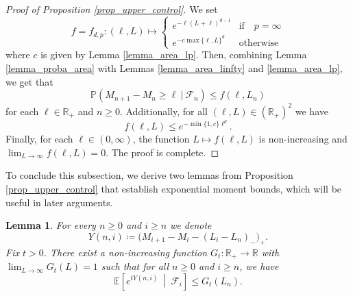 \documentclass[a4paper, 11pt]{article}
\theoremstyle{plain}
\newtheorem{Lemma}[Theorem]{Lemma}
\theoremstyle{definition}
\newcommand{\E}{\mathbb{E}}
\newcommand{\R}{\mathbb{R}}
\renewcommand{\P}{\mathbb{P}}
\numberwithin{equation}{section}
\begin{document}
\begin{proof}[Proof of Proposition \ref{prop_upper_control}]
    We set
        \[f=f_{d, p}:(\ell, L)\mapsto\begin{cases}
            e^{-\ell(L+\ell)^{d-1}}&\text{if}\quad p=\infty\\
            e^{-c\max\{\ell, L\}^d}&\text{otherwise}
        \end{cases}\]
    where $c$ is given by Lemma \ref{lemma_area_lp}. Then, combining Lemma \ref{lemma_proba_area} with Lemmas \ref{lemma_area_linfty} and \ref{lemma_area_lp}, we get that
        \[\P(M_{n+1}-M_n\geq\ell~|~\mathcal F_n)\leq f(\ell, L_n)\]
    for each $\ell\in\R_+$ and $n\geq 0$. Additionally, for all $(\ell, L)\in(\R_+)^2$ we have
        \[f(\ell, L)\leq e^{-\min\{1,c\}\ell^d}.\]
    Finally, for each $\ell\in(0,\infty)$, the function $L\mapsto f(\ell, L)$ is non-increasing and $\lim_{L\to\infty}f(\ell, L)=0$. The proof is complete.
\end{proof}

To conclude this subsection, we derive two lemmas from Proposition \ref{prop_upper_control} that establish exponential moment bounds, which will be useful in later arguments.

\begin{Lemma}
    \label{lemma_GtL}
    For every $n\geq 0$ and $i\geq n$ we denote
        \[Y(n, i)\coloneqq \big(M_{i+1}-M_i-(L_i-L_n)_-\big)_+.\]
    Fix $t>0$. There exist a non-increasing function $G_t:\R_+\to\R$ with $\lim_{L\to\infty}G_t(L)=1$ such that for all $n\geq 0$ and $i\geq n$, we have
        \[\E\left[e^{tY(n, i)}~\middle\vert~\mathcal F_i\right]\leq G_t(L_n).\]
\end{Lemma}
\end{document}
